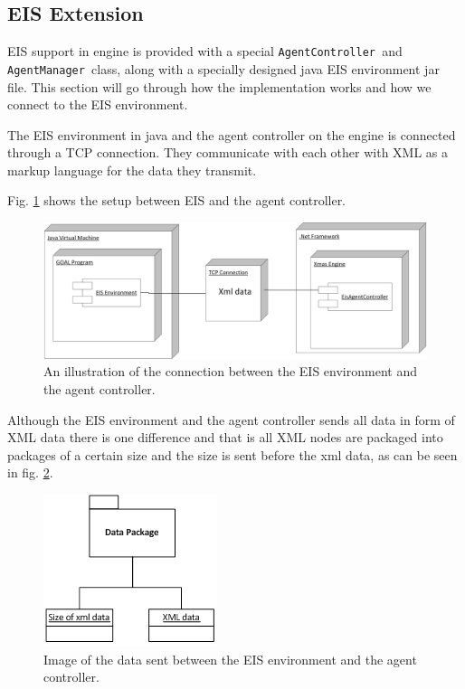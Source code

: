 \subsection{EIS Extension}

EIS support in engine is provided with a special \texttt{AgentController
}and\texttt{ AgentManager }class, along with a specially designed
java EIS environment jar file. This section will go through how the
implementation works and how we connect to the EIS environment.

The EIS environment in java and the agent controller on the engine
is connected through a TCP connection. They communicate with each
other with XML as a markup language for the data they transmit. 

Fig. \ref{fig:DeploymentEISandAgentController} shows the setup between
EIS and the agent controller.

\begin{figure}
\begin{centering}
\includegraphics[width=1\textwidth]{DeploymentEISandAgentController}
\par\end{centering}

\caption{An illustration of the connection between the EIS environment and
the agent controller.\label{fig:DeploymentEISandAgentController}}


\end{figure}


Although the EIS environment and the agent controller sends all data
in form of XML data there is one difference and that is all XML nodes
are packaged into packages of a certain size and the size is sent
before the xml data, as can be seen in fig. \ref{fig:DataPackaging}.

\begin{figure}
\begin{centering}
\includegraphics[scale=0.8]{XMLDataPackageFigure}
\par\end{centering}

\caption{Image of the data sent between the EIS environment and the agent controller.\label{fig:DataPackaging}}


\end{figure}


